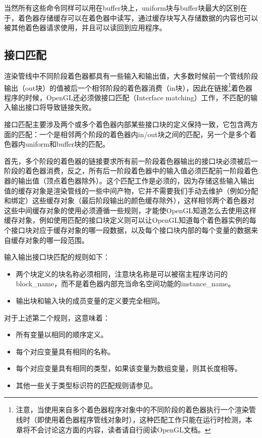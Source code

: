 当然所有这些命令同样可以用在buffer块上，uniform块与buffer块最大的区别在于，着色器存储缓存可以在着色器中读写，通过缓存块写入存储数据的内容也可以被其他着色器请求使用，并且可以读回到应用程序。





\subsection{接口匹配}
渲染管线中不同阶段着色器都具有一些输入和输出值，大多数时候前一个管线阶段输出（out块）的值被后一个相邻阶段的着色器消费（in块），因此在链接\footnote{注意，当使用来自多个着色器程序对象中的不同阶段的着色器执行一个渲染管线时（即使用着色器程序管线对象时），这种匹配工作只能在运行时检测，本章将不会讨论这方面的内容，读者请自行阅读OpenGL文档。}着色器程序的时候，OpenGL还必须做接口匹配（Interface matching）工作，不匹配的输入输出接口将导致链接失败。

接口匹配主要涉及两个或多个着色器内部某些接口块的定义保持一致，它包含两方面的匹配：一个是相邻两个阶段的着色器内in/out块之间的匹配，另一个是多个着色器内uniform和buffer块的匹配。

首先，多个阶段的着色器的链接要求所有前一阶段着色器输出的接口块必须被后一阶段的着色器消费，反之，所有后一阶段着色器中的输入值必须匹配前一阶段着色器的输出值（顶点着色器除外）。这个匹配工作是必须的，因为存储这些输入输出值的缓存对象是渲染管线的一些中间产物，它并不需要我们手动去维护（例如分配和绑定）这些缓存对象（最后阶段输出的颜色缓存除外），这样相邻两个着色器对这些中间缓存对象的使用必须遵循一些规则，才能使OpenGL知道怎么去使用这样缓存对象，例如使用匹配的接口块定义则可以让OpenGL知道每个着色器实例的每个接口块对应于缓存对象的哪一段数据，以及每个接口块内部的每个变量的数据来自缓存对象的哪一段范围。

输入输出接口块匹配的规则如下：

\begin{itemize}
	\item 两个块定义的块名称必须相同，注意块名称是可以被宿主程序访问的block\_name，而不是着色器内部充当命名空间功能的instance\_name。
	\item 输出块和输入块的成员变量的定义要完全相同。

\end{itemize}

对于上述第二个规则，这意味着：

\begin{itemize}
	\item 所有变量以相同的顺序定义。
	\item 每个对应变量具有相同的名称。
	\item 每个对应变量具有相同的类型，如果该变量为数组变量，则其长度相等。
	\item 其他一些关于类型标识符的匹配规则请参见\cite{b:OpenGL4.5CoreProfile}。
\end{itemize}

